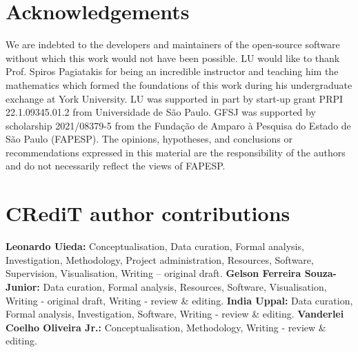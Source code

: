 \section*{Acknowledgements}


We are indebted to the developers and maintainers of the open-source software
without which this work would not have been possible.
LU would like to thank Prof. Spiros Pagiatakis for being an incredible instructor and teaching him the mathematics which formed the foundations of this work during his undergraduate exchange at York University.
LU was supported in part by start-up grant PRPI 22.1.09345.01.2 from Universidade de São Paulo.
GFSJ was supported by scholarship 2021/08379-5 from the Fundação de Amparo à Pesquisa do Estado de São Paulo (FAPESP).
The opinions, hypotheses, and conclusions or recommendations expressed in this material are the responsibility of the authors and do not necessarily reflect the views of FAPESP.

\section*{CRediT author contributions}

\textbf{Leonardo Uieda:} Conceptualisation, Data curation, Formal analysis, Investigation, Methodology, Project administration, Resources, Software, Supervision, Visualisation, Writing – original draft.
\textbf{Gelson Ferreira Souza-Junior:} Data curation, Formal analysis, Resources, Software, Visualisation, Writing - original draft, Writing - review \& editing.
\textbf{India Uppal:} Data curation, Formal analysis, Investigation, Software, Writing - review \& editing.
\textbf{Vanderlei Coelho Oliveira Jr.:} Conceptualisation, Methodology, Writing - review \& editing.